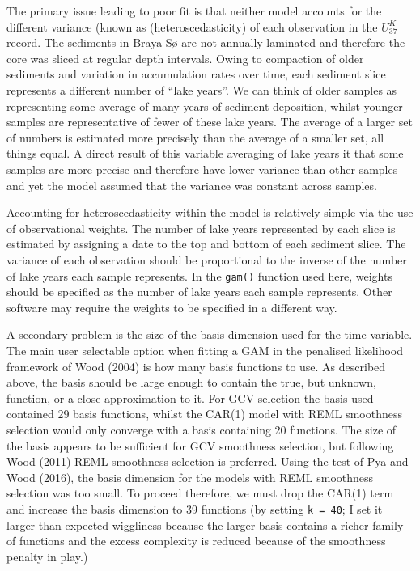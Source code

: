 \documentclass[12pt,]{article}
\newcommand{\uk}{\ensuremath{\mathit{U}^{\mathit{K}}_{\mathup{37}}}}
\begin{document}
The primary issue leading to poor fit is that neither model accounts for
the different variance (known as (heteroscedasticity) of each
observation in the \uk{} record. The sediments in Braya-Sø are not
annually laminated and therefore the core was sliced at regular depth
intervals. Owing to compaction of older sediments and variation in
accumulation rates over time, each sediment slice represents a different
number of ``lake years''. We can think of older samples as representing
some average of many years of sediment deposition, whilst younger
samples are representative of fewer of these lake years. The average of
a larger set of numbers is estimated more precisely than the average of
a smaller set, all things equal. A direct result of this variable
averaging of lake years it that some samples are more precise and
therefore have lower variance than other samples and yet the model
assumed that the variance was constant across samples.

Accounting for heteroscedasticity within the model is relatively simple
via the use of observational weights. The number of lake years
represented by each slice is estimated by assigning a date to the top
and bottom of each sediment slice. The variance of each observation
should be proportional to the inverse of the number of lake years each
sample represents. In the \texttt{gam()} function used here, weights
should be specified as the number of lake years each sample represents.
Other software may require the weights to be specified in a different
way.

A secondary problem is the size of the basis dimension used for the time
variable. The main user selectable option when fitting a GAM in the
penalised likelihood framework of Wood (2004) is how many basis
functions to use. As described above, the basis should be large enough
to contain the true, but unknown, function, or a close approximation to
it. For GCV selection the basis used contained 29 basis functions,
whilst the CAR(1) model with REML smoothness selection would only
converge with a basis containing 20 functions. The size of the basis
appears to be sufficient for GCV smoothness selection, but following
Wood (2011) REML smoothness selection is preferred. Using the test of
Pya and Wood (2016), the basis dimension for the models with REML
smoothness selection was too small. To proceed therefore, we must drop
the CAR(1) term and increase the basis dimension to 39 functions (by
setting \texttt{k\ =\ 40}; I set it larger than expected wiggliness
because the larger basis contains a richer family of functions and the
excess complexity is reduced because of the smoothness penalty in play.)
\end{document}
